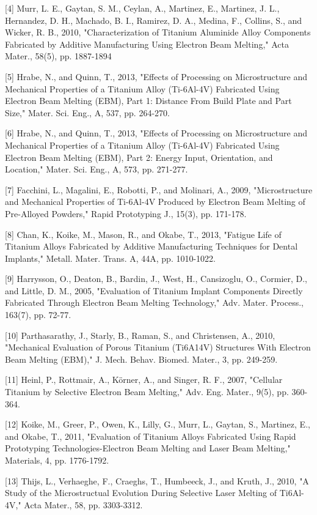 \documentclass[10pt]{article}
\begin{document}
[4] Murr, L. E., Gaytan, S. M., Ceylan, A., Martinez, E., Martinez, J. L., Hernandez, D. H., Machado, B. I., Ramirez, D. A., Medina, F., Collins, S., and Wicker, R. B., 2010, "Characterization of Titanium Aluminide Alloy Components Fabricated by Additive Manufacturing Using Electron Beam Melting," Acta Mater., 58(5), pp. 1887-1894

[5] Hrabe, N., and Quinn, T., 2013, "Effects of Processing on Microstructure and Mechanical Properties of a Titanium Alloy (Ti-6Al-4V) Fabricated Using Electron Beam Melting (EBM), Part 1: Distance From Build Plate and Part Size," Mater. Sci. Eng., A, 537, pp. 264-270.

[6] Hrabe, N., and Quinn, T., 2013, "Effects of Processing on Microstructure and Mechanical Properties of a Titanium Alloy (Ti-6Al-4V) Fabricated Using Electron Beam Melting (EBM), Part 2: Energy Input, Orientation, and Location," Mater. Sci. Eng., A, 573, pp. 271-277.

[7] Facchini, L., Magalini, E., Robotti, P., and Molinari, A., 2009, "Microstructure and Mechanical Properties of Ti-6Al-4V Produced by Electron Beam Melting of Pre-Alloyed Powders," Rapid Prototyping J., 15(3), pp. 171-178.

[8] Chan, K., Koike, M., Mason, R., and Okabe, T., 2013, "Fatigue Life of Titanium Alloys Fabricated by Additive Manufacturing Techniques for Dental Implants," Metall. Mater. Trans. A, 44A, pp. 1010-1022.

[9] Harrysson, O., Deaton, B., Bardin, J., West, H., Cansizoglu, O., Cormier, D., and Little, D. M., 2005, "Evaluation of Titanium Implant Components Directly Fabricated Through Electron Beam Melting Technology," Adv. Mater. Process., 163(7), pp. 72-77.

[10] Parthasarathy, J., Starly, B., Raman, S., and Christensen, A., 2010, "Mechanical Evaluation of Porous Titanium (Ti6A14V) Structures With Electron Beam Melting (EBM)," J. Mech. Behav. Biomed. Mater., 3, pp. 249-259.

[11] Heinl, P., Rottmair, A., Körner, A., and Singer, R. F., 2007, "Cellular Titanium by Selective Electron Beam Melting," Adv. Eng. Mater., 9(5), pp. 360-364.

[12] Koike, M., Greer, P., Owen, K., Lilly, G., Murr, L., Gaytan, S., Martinez, E., and Okabe, T., 2011, "Evaluation of Titanium Alloys Fabricated Using Rapid Prototyping Technologies-Electron Beam Melting and Laser Beam Melting," Materials, 4, pp. 1776-1792.

[13] Thijs, L., Verhaeghe, F., Craeghs, T., Humbeeck, J., and Kruth, J., 2010, "A Study of the Microstructual Evolution During Selective Laser Melting of Ti6Al-4V," Acta Mater., 58, pp. 3303-3312.
\end{document}
